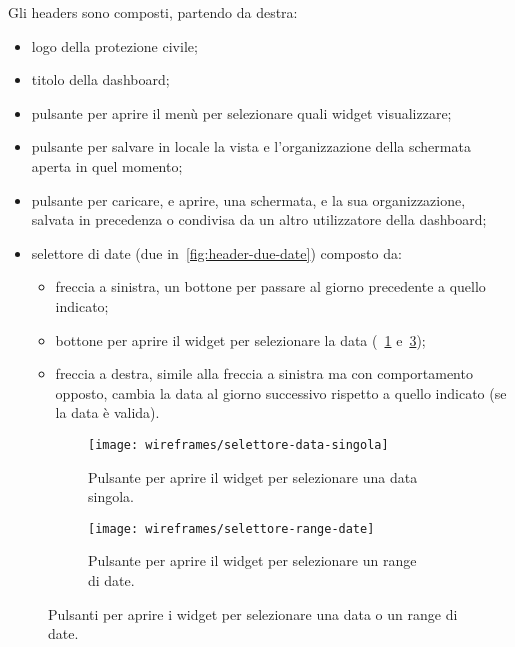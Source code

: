 Gli headers sono composti, partendo da destra:
\begin{itemize}
    \item logo della protezione civile;
    \item titolo della dashboard;
    \item pulsante per aprire il menù per selezionare quali widget visualizzare;
    \item pulsante per salvare in locale la vista e l'organizzazione della schermata aperta in quel momento;
    \item pulsante per caricare, e aprire, una schermata, e la sua organizzazione, salvata in precedenza o condivisa da un altro utilizzatore della dashboard;
    \item selettore di date (due in~\ref{fig:header-due-date}) composto da:
        \begin{itemize}
            \item freccia a sinistra, un bottone per passare al giorno precedente a quello indicato;
            \item bottone per aprire il widget per selezionare la data (~\ref{fig:selettore-data-singola} e~\ref{fig:selettore-range-date});
            \item freccia a destra, simile alla freccia a sinistra ma con comportamento opposto, cambia la data al giorno successivo rispetto a quello indicato (se la data è valida).
        \end{itemize}
\end{itemize}

\begin{figure}[H]
    \begin{subfigure}[b]{0.5\textwidth}
        \centering
        \texttt{[image: wireframes/selettore-data-singola]}
        \caption{Pulsante per aprire il widget per selezionare una data singola.}
        \label{fig:selettore-data-singola}
    \end{subfigure}
\hfill
    \begin{subfigure}[b]{0.5\textwidth}
        \centering
        \texttt{[image: wireframes/selettore-range-date]}
        \caption{Pulsante per aprire il widget per selezionare un range di date.}
        \label{fig:selettore-range-date}
    \end{subfigure}
    \caption{Pulsanti per aprire i widget per selezionare una data o un range di date.}
\end{figure}


